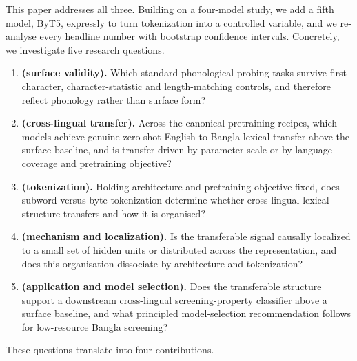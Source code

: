 \documentclass[preprint,12pt]{elsarticle}
\begin{document}
This paper addresses all three. Building on a four-model study, we add a fifth model, ByT5, expressly to turn tokenization into a controlled variable, and we re-analyse every headline number with bootstrap confidence intervals. Concretely, we investigate five research questions.
\begin{enumerate}
\item[\textbf{RQ1}] \textbf{(surface validity).} Which standard phonological probing tasks survive first-character, character-statistic and length-matching controls, and therefore reflect phonology rather than surface form?
\item[\textbf{RQ2}] \textbf{(cross-lingual transfer).} Across the canonical pretraining recipes, which models achieve genuine zero-shot English-to-Bangla lexical transfer above the surface baseline, and is transfer driven by parameter scale or by language coverage and pretraining objective?
\item[\textbf{RQ3}] \textbf{(tokenization).} Holding architecture and pretraining objective fixed, does subword-versus-byte tokenization determine whether cross-lingual lexical structure transfers and how it is organised?
\item[\textbf{RQ4}] \textbf{(mechanism and localization).} Is the transferable signal causally localized to a small set of hidden units or distributed across the representation, and does this organisation dissociate by architecture and tokenization?
\item[\textbf{RQ5}] \textbf{(application and model selection).} Does the transferable structure support a downstream cross-lingual screening-property classifier above a surface baseline, and what principled model-selection recommendation follows for low-resource Bangla screening?
\end{enumerate}
These questions translate into four contributions.
\end{document}
